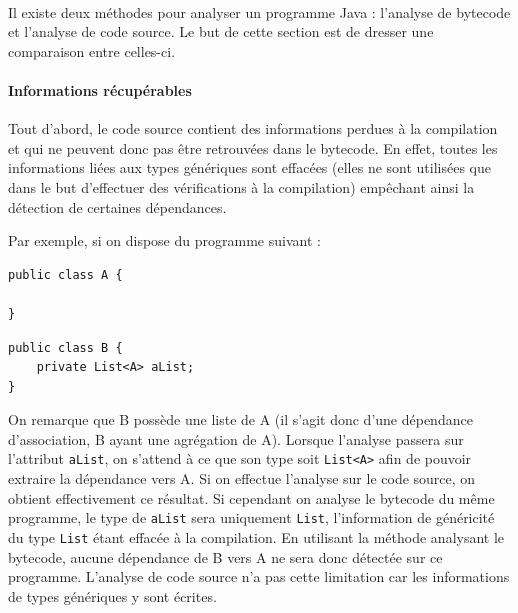 \documentclass{scrartcl}
\begin{document}
    \paragraph{}Il existe deux méthodes pour analyser un programme Java : l'analyse de bytecode et l'analyse de code source. Le but de cette section est de dresser une comparaison entre celles-ci.
    
    \paragraph{Informations récupérables}Tout d'abord, le code source contient des informations perdues à la compilation et qui ne peuvent donc pas être retrouvées dans le bytecode. En effet, toutes les informations liées aux types génériques sont effacées (elles ne sont utilisées que dans le but d'effectuer des vérifications à la compilation) empêchant ainsi la détection de certaines dépendances.
    
    Par exemple, si on dispose du programme suivant :
    
    \begin{minipage}{(\textwidth/2) - 0.6cm}
        \begin{lstlisting}
public class A {

}
        \end{lstlisting}
    \end{minipage}
    \hspace{0.5cm}
    \begin{minipage}{(\textwidth/2) - 0.6cm}
        \begin{lstlisting}
public class B {
    private List<A> aList;
}
        \end{lstlisting}
    \end{minipage}
    
    On remarque que B possède une liste de A (il s'agit donc d'une dépendance d'association, B ayant une agrégation de A). Lorsque l'analyse passera sur l'attribut \texttt{aList}, on s'attend à ce que son type soit \texttt{List<A>} afin de pouvoir extraire la dépendance vers A. Si on effectue l'analyse sur le code source, on obtient effectivement ce résultat. Si cependant on analyse le bytecode du même programme, le type de \texttt{aList} sera uniquement \texttt{List}, l'information de généricité du type \texttt{List} étant effacée à la compilation. En utilisant la méthode analysant le bytecode, aucune dépendance de B vers A ne sera donc détectée sur ce programme. L'analyse de code source n'a pas cette limitation car les informations de types génériques y sont écrites.
    
\end{document}

